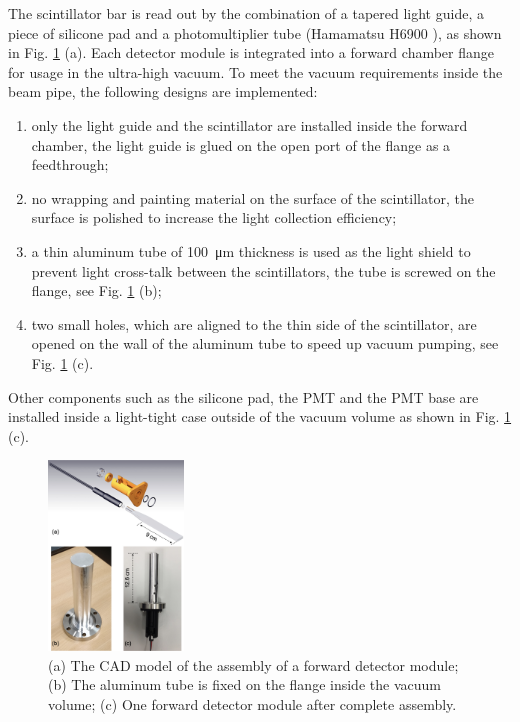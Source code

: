 \documentclass[number,5p]{elsarticle}
\begin{document}
The scintillator bar is read out by the combination of a tapered light guide, a piece of silicone pad and a
photomultiplier tube (Hamamatsu H6900 \cite{hamamatsu}), as shown in Fig. \ref{fig:forward_module} (a).
Each detector module is integrated into a forward chamber flange for usage
in the ultra-high vacuum.
To meet the vacuum requirements inside the beam pipe, the following designs are implemented:
\begin{enumerate}
\item only the light guide and the scintillator are installed inside the forward chamber, the light guide is glued on the open port of the flange as a feedthrough;
\item no wrapping and painting material on the surface of the scintillator, the
  surface is polished to increase the light collection efficiency;
\item a thin aluminum tube of \SI{100}{\micro\meter} thickness is used as
  the light shield to prevent light cross-talk between the scintillators, the tube is screwed on the flange, see Fig. \ref{fig:forward_module} (b);
\item two small holes, which are aligned to the thin side of the scintillator, are opened on the wall of the aluminum tube to speed up vacuum pumping, see Fig. \ref{fig:forward_module} (c).
\end{enumerate}
Other components such as the silicone pad, the PMT and the PMT base are
installed inside a light-tight case outside of the vacuum volume as shown in Fig. \ref{fig:forward_module} (c).
\begin{figure}[htbp]
  \centering
  \includegraphics[width=0.32\textwidth]{./forward_module.png}
  \caption{(a) The CAD model of the assembly of a forward detector module; (b) The
    aluminum tube is fixed on the flange inside the vacuum volume; (c) One forward detector module after complete assembly.}
  \label{fig:forward_module}
\end{figure}
\end{document}
